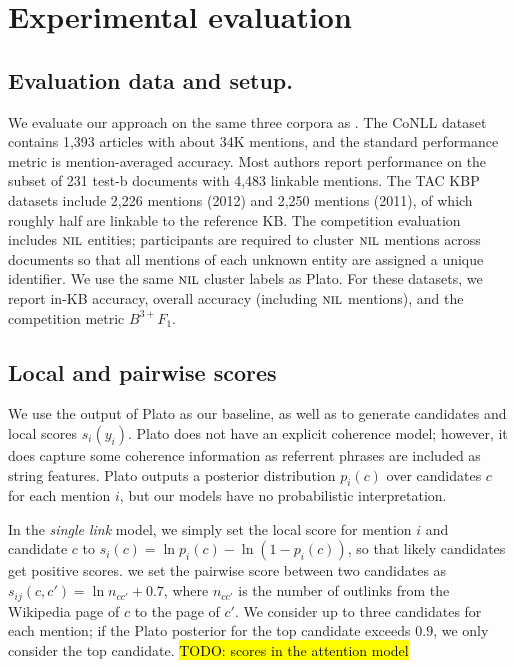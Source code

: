 \section{Experimental evaluation}

\subsection{Evaluation data and setup.}
We evaluate our approach on the same three corpora as . The CoNLL dataset ~\cite{Hachey2013130} contains 1,393 articles with about 34K
mentions, and the standard performance metric is mention-averaged accuracy. Most authors report performance on the subset of 231 test-b documents with 4,483 linkable mentions.
The TAC KBP datasets \cite{TAC2011,TAC2012} include 2,226 mentions (2012) and 2,250 mentions (2011), of which roughly half are linkable to the reference KB. The competition evaluation includes $\mbox{\textsc{nil}}$ entities;
participants are required to cluster $\mbox{\textsc{nil}}$ mentions across documents
so that all mentions of each unknown entity are assigned a unique
identifier. We use the same $\mbox{\textsc{nil}}$ cluster labels as Plato. For these datasets, we report in-KB accuracy, overall accuracy (including $\mbox{\textsc{nil}}$ mentions), and the competition metric $B^{3+} F_1$. 

\subsection{Local and pairwise scores}
We use the output of Plato \cite{Lazic2015} as our baseline, as well as to generate candidates and local scores $s_i(y_i)$. Plato does not have an explicit coherence model; however, it does capture some coherence information as referrent phrases are included as string features. Plato outputs a posterior distribution $p_i(c)$ over candidates $c$ for each mention $i$, but our models have no probabilistic interpretation.

In the \emph{single link} model, we simply set the local score for mention $i$ and candidate $c$ to $s_i(c) = \ln p_i(c) - \ln (1 - p_i(c))$, so that likely candidates get positive scores. we set the pairwise score between two candidates as $s_{ij}(c, c') = \ln n_{cc'} + 0.7$, where $n_{cc'}$ is the number of outlinks from the Wikipedia page of $c$ to the page of $c'$.  We consider up to three candidates for each mention; if the Plato posterior for the top candidate exceeds $0.9$, we only consider the top candidate.  \hl{TODO: scores in the attention model}



